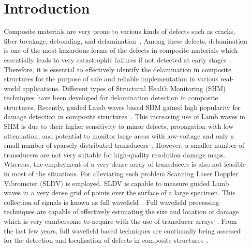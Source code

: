 \section{Introduction}
Composite materials are very prone to various kinds of defects such as cracks, fiber breakage, debonding, and delamination~\cite{ip2004delamination, smith2009composite}. Among these defects, delamination is one of the most hazardous forms of the defects in composite materials which essentially leads to very catastrophic failures if not detected at early stages~\cite{valdes1999delamination}. Therefore, it is essential to effectively identify the delamination in composite structures for the purpose of safe and reliable implementation in various real-world applications. Different types of Structural Health Monitoring (SHM) techniques have been developed for delamination detection in composite structures. Recently, guided Lamb waves based SHM gained high popularity for damage detection in composite structures~\cite{mitra2016guided}. This increasing use of Lamb waves in SHM is due to their higher sensitivity to minor defects, propagation with low attenuation, and potential to monitor large areas with low-voltage and only a small number of sparsely distributed transducers~\cite{alleyne1992interaction, giurgiutiu2003lamb, ihn2008pitch, mitra2016guided}. However, a smaller number of transducers are not very suitable for high-quality resolution damage maps. Whereas, the employment of a very dense array of transducers is also not feasible in most of the situations. For alleviating such problem Scanning Laser Doppler Vibrometer (SLDV) is employed. SLDV is capable to measure guided Lamb waves in a very dense grid of points over the surface of a large specimen. This collection of signals is known as full wavefield~\cite{radzienski2019damage}. Full wavefield processing techniques are capable of effectively estimating the size and location of damage which is very cumbersome to acquire with the use of transducer arrays~\cite{girolamo2018impact, kudela2018impact}. From the last few years, full wavefield based techniques are continually being assessed for the detection and localisation of defects in composite structures~\cite{sohn2011delamination, sohn2011automated, rogge2013characterization, kudela2018impact, radzienski2019damage}.

